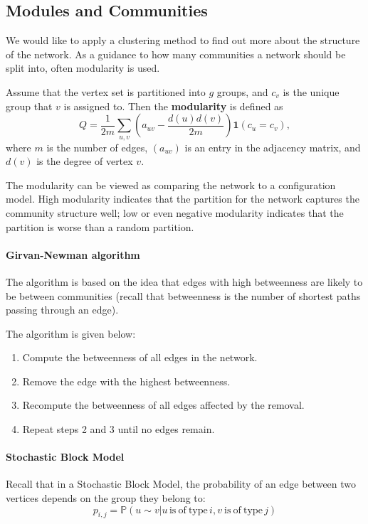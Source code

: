 \documentclass{article}
\begin{document}
\subsection{Modules and Communities}
We would like to apply a clustering method to find out more about the structure of the network. As a guidance to how many communities a network should be split into, often modularity is used.  
\begin{definition}
    Assume that the vertex set is partitioned into \( g \) groups, and
\( c_v \) is the unique group that \( v \) is assigned to. 
Then the \textbf{modularity} is defined as
\[
Q = \frac{1}{2m} \sum_{u,v} \left( a_{uv} - \frac{d(u)d(v)}{2m} \right) \mathbf{1}(c_u= c_v),
\]
where \( m \) is the number of edges, \((a_{uv}) \) is an entry in the adjacency matrix, and \( d(v) \)
is the degree of vertex \( v \).
\end{definition}

The modularity can be viewed as comparing the network to a configuration model. High modularity indicates that the partition for the network captures the community structure well; low or even negative modularity indicates that the partition is worse than a random partition.  

\paragraph{Girvan-Newman algorithm} The algorithm is based on the idea that edges with high betweenness are likely to be between communities (recall that betweenness is the number of shortest paths passing through an edge).

The algorithm is given below:
\begin{enumerate}
    \item Compute the betweenness of all edges in the network.
    \item Remove the edge with the highest betweenness.
    \item Recompute the betweenness of all edges affected by the removal.
    \item Repeat steps 2 and 3 until no edges remain.
\end{enumerate}

\paragraph{Stochastic Block Model}
Recall that in a Stochastic Block Model, the probability of an edge between two vertices depends on the group they belong to: 
\begin{equation*}
    p_{i,j}=\mathbb{P}(u\sim v|u\,\mathrm{is~of~type}\,i,v{\mathrm{~is~of~type}}\,j)
\end{equation*}
\end{document}

